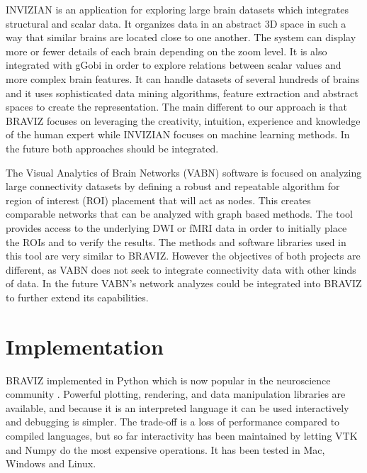 \documentclass[utf8]{frontiersSCNS} %
\begin{document}
INVIZIAN\citep{bowman_query-based_2011,bowman_feature-similarity_2012} is an application for exploring large brain datasets which integrates structural and scalar data. It organizes data in an abstract 3D space in such a way that similar brains are located close to one another. The system can display more or fewer details of each brain depending on the zoom level. It is also integrated with gGobi\citep{cook_interactive_2007} in order to explore relations between scalar values and more complex brain features. It can handle datasets of several hundreds of brains and it uses sophisticated data mining algorithms, feature extraction and abstract spaces to create the representation. The main different to our approach is that BRAVIZ focuses on leveraging the creativity, intuition, experience and knowledge of the human expert while INVIZIAN focuses on machine learning methods. In the future both approaches should be integrated.

The Visual Analytics of Brain Networks\citep{li_visual_2012} (VABN) software is focused on analyzing large connectivity datasets by defining a robust and repeatable algorithm for region of interest (ROI) placement that will act as nodes. This creates comparable networks that can be analyzed with graph based methods. The tool provides access to the underlying DWI or fMRI data in order to initially place the ROIs and to verify the results. The methods and software libraries used in this tool are very similar to BRAVIZ. However the objectives of both projects are different, as VABN does not seek to integrate connectivity data with other kinds of data. In the future VABN’s network analyzes could be integrated into BRAVIZ to further extend its capabilities.

\section{Implementation}

BRAVIZ implemented in Python which is now popular in the neuroscience community \citep{gorgolewski_nipype:_2011, garyfallidis_dipy_2014}.  Powerful plotting, rendering, and data manipulation libraries are available, and because it is an interpreted language it can be used interactively and debugging is simpler. The trade-off is a loss of performance compared to compiled languages, but so far interactivity has been maintained by letting VTK\citep{schroeder_vtk_1998} and Numpy\citep{van_der_walt_numpy_2011} do the most expensive operations. It has been tested in Mac, Windows and Linux.
\end{document}
